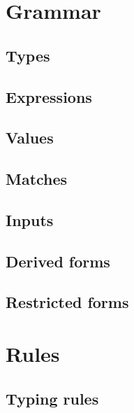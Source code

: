
\section{Grammar}

\subsection{Types}



\subsection{Expressions}



\subsection{Values}



\subsection{Matches}



\subsection{Inputs}



\subsection{Derived forms}



\subsection{Restricted forms}



\newpage
\section{Rules}

\subsection{Typing rules}

